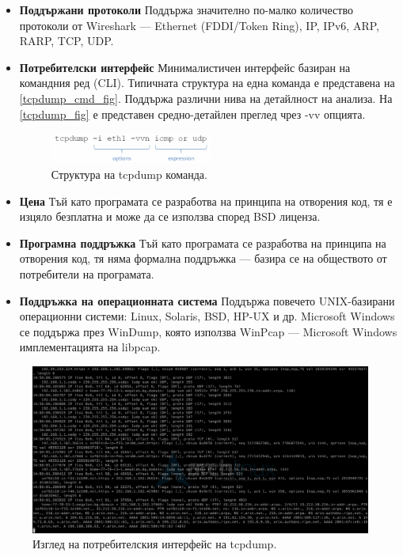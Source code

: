 \documentclass[12pt,a4paper,oneside]{book}
\begin{document}
\begin{itemize}
  \item \textbf{Поддържани протоколи} Поддържа значително по-малко количество
    протоколи от Wireshark --- Ethernet (FDDI/Token Ring), IP, IPv6, ARP, RARP,
    TCP, UDP.
  \item \textbf{Потребителски интерфейс} Минималистичен интерфейс базиран на
    командния ред (CLI). Типичната структура на една команда е представена на
    \autoref{tcpdump_cmd_fig}. Поддържа различни нива на детайлност на анализа.
    На \autoref{tcpdump_fig} е представен средно-детайлен преглед чрез -vv
    опцията.

  \begin{figure}[h!]
    \centering
    \includegraphics[width=0.5\textwidth]{figures/tcpdump_cmd.png}
    \caption{Структура на tcpdump команда.}
    \label{tcpdump_cmd_fig}
  \end{figure}

  \item \textbf{Цена} Тъй като програмата се разработва на принципа на отворения
    код, тя е изцяло безплатна и може да се използва според BSD лиценза.
  \item \textbf{Програмна поддръжка} Тъй като програмата се разработва на
    принципа на отворения код, тя няма формална поддръжка ---
    базира се на обществото от потребители на програмата.
  \item \textbf{Поддръжка на операционната система} Поддържа повечето
    UNIX-базирани операционни системи: Linux, Solaris, BSD, HP-UX и др.
    Microsoft Windows се поддържа през WinDump, която използва
    WinPcap --- Microsoft Windows имплементацията на libpcap.
\end{itemize}


\begin{figure}[h!]
  \centering
  \includegraphics[width=1.0\textwidth]{figures/tcpdump.png}
  \caption{Изглед на потребителския интерфейс на tcpdump.}
  \label{tcpdump_fig}
\end{figure}
\end{document}
